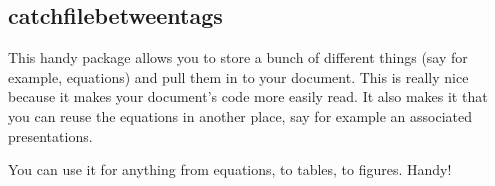 \documentclass[hidelinks]{article}
\begin{document}
        \subsection{catchfilebetweentags}
            This handy package allows you to store a bunch of different things (say for example, equations) and pull them in to your document. This is really nice because it makes your document's code more easily read. It also makes it that you can reuse the equations in another place, say for example an associated presentations.

            You can use it for anything from equations,
            to tables,
            to figures.
            Handy!

    \clearpage
    \standaloneBib
\end{document}
